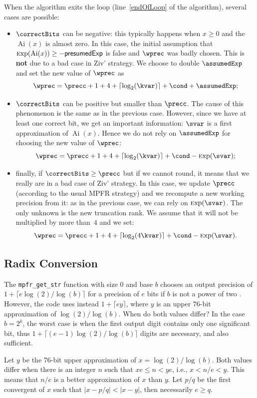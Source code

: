 \documentclass[12pt]{amsart}
\DeclareMathOperator{\Ai}{Ai}
\def\Exp{{\rm \textsc exp}}
\begin{document}
When the algorithm exits the loop (line~\ref{endOfLoop} of the algorithm), several cases are possible:
\begin{itemize}
\item $\correctBits$ can be negative: this typically happens when $x \ge 0$ and the $\Ai(x)$ is almost zero. In this case, the initial assumption that $\Exp(\Ai(x)) \ge -\mathsf{presumedExp}$ is false and $\wprec$ was badly chosen. This is \textbf{not} due to a bad case in Ziv' strategy. We choose to double $\assumedExp$ and set the new value of $\wprec$ as 
$$  \wprec = \precc + 1 + 4 + \lceil \log_2(\kvar)\rceil + \cond + \assumedExp;$$
\item $\correctBits$ can be positive but smaller than $\precc$. The cause of this phenomenon is the same as in the previous case. However, since we have at least one correct bit, we get an important information: $\svar$ is a first approximation of $\Ai(x)$. Hence we do not rely on $\assumedExp$ for choosing the new value of $\wprec$:
$$  \wprec = \precc + 1 + 4 + \lceil \log_2(\kvar)\rceil + \cond - \Exp(\svar);$$
\item finally, if $\correctBits \ge \precc$ but if we cannot round, it means that we really are in a bad case of Ziv' strategy. In this case, we update $\precc$ (according to the usual MPFR strategy) and we recompute a new working precision from it: as in the previous case, we can rely on $\Exp(\svar)$. The only unknown is the new truncation rank. We assume that it will not be multiplied by more than~$4$ and we set:
$$  \wprec = \precc + 1 + 4 + \lceil \log_2(4\kvar)\rceil + \cond - \Exp(\svar).$$
\end{itemize}

\subsection{Radix Conversion}

The \texttt{mpfr\_get\_str} function with size $0$ and base $b$ chooses an
output precision of $1 + \lceil e \log(2)/\log(b) \rceil$ for a precision
of $e$ bits if $b$ is not a power of two \cite{Mat68}.
However, the code uses instead $1 + \lceil e y \rceil$, where $y$ is
an upper $76$-bit approximation of $\log(2)/\log(b)$. When do both values
differ?
In the case $b=2^k$, the worst case is when the first output digit contains
only one significant bit, thus
$1 + \lceil (e-1) \log(2)/\log(b) \rceil$ digits are necessary, and also
sufficient.

Let $y$ be the $76$-bit upper approximation of $x=\log(2)/\log(b)$.
Both values differ when there is an integer $n$ such that
$x e\leq n < y e$, i.e., $x < n/e < y$. This means that $n/e$ is a better
approximation of $x$ than $y$.
Let $p/q$ be the first convergent of $x$ such that $|x-p/q| < |x-y|$,
then necessarily $e \geq q$.
\end{document}

